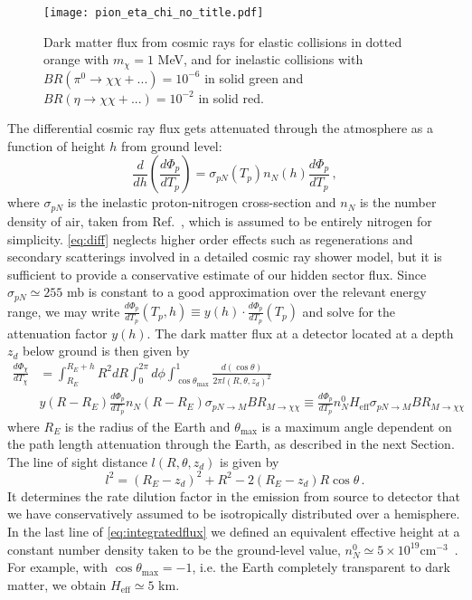 \begin{figure}[t]
\begin{center}
\texttt{[image: pion\_eta\_chi\_no\_title.pdf]}
\end{center}
\caption{Dark matter flux from cosmic rays for elastic collisions in dotted orange with $m_\chi = 1$ MeV, and for inelastic collisions with $BR(\pi^0 \to \chi \chi + ...) = 10^{-6}$ in solid green and $BR(\eta \to \chi\chi + ...) = 10^{-2}$ in solid red.
\label{fig:flux}}
\end{figure}

The differential cosmic ray flux gets attenuated through the atmosphere as a function of height $h$ from ground level: 
%
\begin{equation}
\frac{d}{dh}\left(\frac{d\Phi_p}{dT_p}\right) = \sigma_{pN}(T_p) n_N(h) \frac{d\Phi_p}{dT_p} \, ,
\label{eq:diff}
\end{equation}
%
where $\sigma_{pN}$ is the inelastic proton-nitrogen cross-section and $n_N$ is the number density of air, taken from Ref.~\cite{Jursa:1985}, which is assumed to be entirely nitrogen for simplicity. \eqref{eq:diff} neglects higher order effects such as regenerations and secondary scatterings involved in a detailed cosmic ray shower model, but it is sufficient to provide a conservative estimate of our hidden sector flux. Since $\sigma_{pN} \simeq 255$ mb is constant to a good approximation over the relevant energy range, we may write $\frac{d\Phi_p}{dT_p}(T_p,h) \equiv y(h) \cdot \frac{d\Phi_p}{dT_p}(T_p)$ and solve for the attenuation factor $y(h)$. The dark matter flux at a detector located at a depth $z_d$ below ground is then given by
%
\begin{align} \frac{d \Phi_{\chi}}{d T_{\chi}} &=\int_{R_{E}}^{R_{E}+h} R^{2} d R \int_{0}^{2 \pi} d \phi \int_{\cos \theta_{\max }}^{1} \frac{d(\cos \theta)}{2 \pi l\left(R, \theta, z_{d}\right)^{2}} \nonumber \\ & y\left(R-R_{E}\right) \frac{d \Phi_{p}}{d T_{p}} n_{N}\left(R-R_{E}\right) \sigma_{p N \rightarrow M} B R_{M \rightarrow \chi \chi} \equiv \frac{d \Phi_{p}}{d T_{p}} n_{N}^{0} H_{\mathrm{eff}} \sigma_{p N \rightarrow M} B R_{M \rightarrow \chi \chi} \label{eq:integratedflux}\end{align}
where $R_E$ is the radius of the Earth and $\theta_{\mathrm{max}}$ is a maximum angle dependent on the path length attenuation through the Earth, as described in the next Section. The line of sight distance $l(R,\theta, z_d)$ is given by 
%
\begin{equation}
l^2 = (R_E - z_d)^2 + R^2 - 2(R_E - z_d)R \cos{\theta} \, .
\end{equation}
%
It determines the rate dilution factor in the emission from source to detector that we have conservatively assumed to be isotropically distributed over a hemisphere. In the last line of \eqref{eq:integratedflux} we defined an equivalent effective height at a constant number density taken to be the ground-level value, $n_N^0 \simeq 5\times 10^{19} \mathrm{ cm}^{-3}$~\cite{Jursa:1985}. For example, with $\cos\theta_{\mathrm{max}} = -1$, i.e. the Earth completely transparent to dark matter, we obtain $H_{\mathrm{eff}} \simeq 5$ km. 

